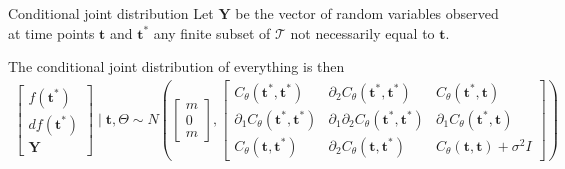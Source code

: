 \documentclass[ignorenonframetext,xcolor=pdflatex,table,dvipsnames,serif]{beamer}
\begin{document}
\begin{frame}{Conditional joint distribution}
Let $\mathbf{Y}$ be the vector of random variables observed at time points $\mathbf{t}$ and $\mathbf{t}^\ast$ any finite subset of $\mathcal{T}$ not necessarily equal to $\mathbf{t}$. 

\vspace{1cm}

The conditional joint distribution of everything is then
{\footnotesize
\begin{align*}
  \begin{bmatrix}f(\mathbf{t}^\ast)\\ df(\mathbf{t}^\ast)\\ \mathbf{Y}\end{bmatrix} \mid \mathbf{t}, \Theta \sim N\left(\begin{bmatrix}m\\ 0\\ m\end{bmatrix}, \begin{bmatrix}C_\theta(\mathbf{t}^\ast,\mathbf{t}^\ast) & \partial_2 C_\theta(\mathbf{t}^\ast, \mathbf{t}^\ast) & C_\theta(\mathbf{t}^\ast, \mathbf{t})\\ \partial_1 C_\theta(\mathbf{t}^\ast, \mathbf{t}^\ast) &  \partial_1 \partial_2 C_\theta(\mathbf{t}^\ast, \mathbf{t}^\ast) & \partial_1 C_\theta(\mathbf{t}^\ast, \mathbf{t})\\ C_\theta(\mathbf{t}, \mathbf{t}^\ast) & \partial_2 C_\theta(\mathbf{t}, \mathbf{t}^\ast) & C_\theta(\mathbf{t}, \mathbf{t}) + \sigma^2 I\end{bmatrix}\right)
\end{align*}
}%
\end{frame}
\end{document}
